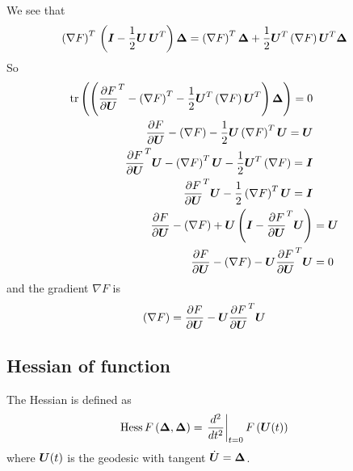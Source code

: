 \documentclass[11pt]{article}
\begin{document}
We see that 
\begin{align*}
\left(\nabla F\right)^{T}\,\left(\boldsymbol{I} - \frac{1}{2}\boldsymbol{U\,U}^{T}\right)  \boldsymbol{\Delta}
&= \left(\nabla F\right)^{T}\boldsymbol{\Delta} + \frac{1}{2}\boldsymbol{U}^{T}\left(\nabla F\right)\boldsymbol{U}^{T}\boldsymbol{\Delta}
\end{align*}
So
\begin{align*}
\mathrm{tr}\left(\left(\frac{\partial F}{ \partial \boldsymbol{U}}^{T} -  \left(\nabla F\right)^{T}-  \frac{1}{2}\boldsymbol{U}^{T}\left(\nabla F\right)\boldsymbol{U}^{T}\right)\boldsymbol{\Delta}  \right) = 0\\
\frac{\partial F}{ \partial \boldsymbol{U}} - \left(\nabla F\right)-  \frac{1}{2}\boldsymbol{U}\left(\nabla F\right)^{T}\boldsymbol{U} = \boldsymbol{U}\\
\frac{\partial F}{ \partial \boldsymbol{U}}^{T}\boldsymbol{U} - \left(\nabla F\right)^{T}\boldsymbol{U} -  \frac{1}{2}\boldsymbol{U}^{T}\left(\nabla F\right)= \boldsymbol{I}\\
\frac{\partial F}{ \partial \boldsymbol{U}}^{T}\boldsymbol{U} - \frac{1}{2}\left(\nabla F\right)^{T}\boldsymbol{U} = \boldsymbol{I}\\
\frac{\partial F}{ \partial \boldsymbol{U}} - \left(\nabla F\right) +   \boldsymbol{U}\left(\boldsymbol{I} -  \frac{\partial F}{ \partial \boldsymbol{U}}^{T}\boldsymbol{U}\right) &= \boldsymbol{U}\\
\frac{\partial F}{ \partial \boldsymbol{U}} - \left(\nabla F\right) -  \boldsymbol{U}\frac{\partial F}{ \partial \boldsymbol{U}}^{T}\boldsymbol{U} &= 0
\end{align*}
and the gradient $\nabla F$ is 
\begin{align}
\left(\nabla F\right) &= \frac{\partial F}{ \partial \boldsymbol{U}}-  \boldsymbol{U}\frac{\partial F}{ \partial \boldsymbol{U}}^{T}\boldsymbol{U}  \label{eqn: gradient_fun_Stiefel}
\end{align} 

\subsection{Hessian of function }
The Hessian is defined as 
\begin{align}
\text{Hess}\,F\left(\boldsymbol{\Delta}, \boldsymbol{\Delta}\right) &= \left.{\frac{d^{2}}{dt^{2}}}\right\vert_{t=0}F\left(\boldsymbol{U}(t)\right)
\end{align}
where $\boldsymbol{U}(t)$ is the geodesic with tangent $\dot{\boldsymbol{U}} = \boldsymbol{\Delta}$.
\end{document}
